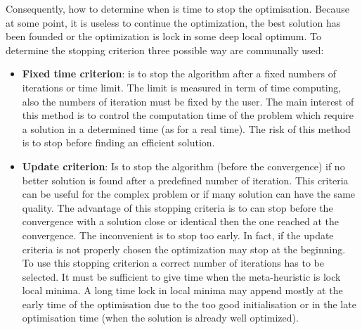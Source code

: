 Consequently, how to determine when is time to stop the optimisation. Because at some point, it is useless to continue the optimization, the best solution has been founded or the optimization is lock in some deep local optimum.%
 To determine the stopping criterion three possible way are communally used:\\
\begin{itemize}
\item  \textbf{Fixed time criterion}: is to stop the algorithm after a fixed numbers of iterations or time limit. The limit is measured in term of time computing, also the numbers of iteration must be fixed by the user. The main interest of this method is to control the computation time of the problem which require a solution in a determined time (as for a real time). The risk of this method is to stop before finding an efficient solution. \\

\item \textbf{Update criterion}: Is to stop the algorithm (before the convergence) if no better solution is found after a predefined number of iteration. This criteria can be useful for the complex problem or if many solution can have the same quality. 
The advantage of this stopping criteria is to can stop before the convergence with a solution close or identical then the one reached at the convergence. 
The inconvenient is to stop too early. In fact, if the update criteria is not properly chosen the optimization  may stop at the beginning.   \\
To use this stopping criterion a correct number of iterations has to  be selected. 
It must be sufficient to give time when the meta-heuristic is lock local minima. 
A long time lock in local minima may append mostly at the early time of the optimisation due to the too good initialisation or in the late optimisation time (when the solution is already well optimized).\\


\end{itemize}
